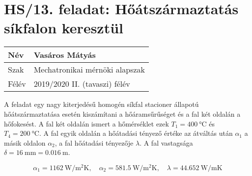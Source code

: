 \section*{HS/13. feladat: Hőátszármaztatás síkfalon keresztül}

\begin{tabular}{ | p{2cm} | p{14cm} | } 
	\hline
	Név & Vasáros Mátyás \\ 
	\hline
	Szak & Mechatronikai mérnöki alapszak\\ 
	\hline
	Félév & 2019/2020 II. (tavaszi) félév \\ 
	\hline
\end{tabular}
\vspace{0.5cm}

\noindent A feladat egy nagy kiterjedésű homogén síkfal stacioner állapotú hőátszármaztatása esetén kiszámítani a hőáramsűrűséget és a fal két oldalán a hőfokesést. A fal két oldalán ismert a hőmérséklet ezek $T_{1}=\SI{400}{\degreeCelsius}$ és $T_{4}=\SI{200}{\degreeCelsius}$. A fal egyik oldalán a hőátadási tényező értéke az átváltás után $\alpha_1$ a másik oldalon $\alpha_2$, a fal hőátadási tényezője $\lambda$. A fal vastagsága $\delta=\SI {16}{\milli\meter}=\SI {0,016}{\meter}$.

\begin{equation*}
	\alpha_1=\SI{1162}{\watt\per\meter\squared\kelvin},
\quad 
	\alpha_2=\SI{581,5}{\watt\per\meter\squared\kelvin},
\quad 
	\lambda=\SI{44,652}{\watt\per\meter\kelvin}
\end{equation*}

\noindent\hrulefill

